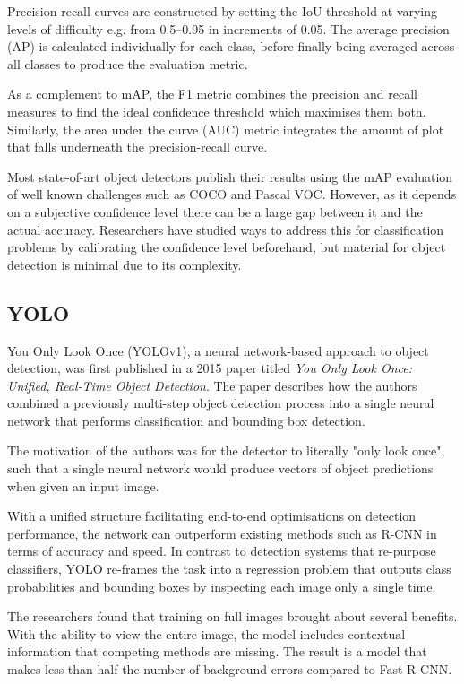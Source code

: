 \documentclass{thesis}
\begin{document}
Precision-recall curves are constructed by setting the IoU threshold at varying levels of difficulty e.g. from 0.5--0.95 in increments of 0.05. The average precision (AP) is calculated individually for each class, before finally being averaged across all classes to produce the evaluation metric.

As a complement to mAP, the F1 metric combines the precision and recall measures to find the ideal confidence threshold which maximises them both. Similarly,
the area under the curve (AUC) metric integrates the amount of plot that falls underneath the precision-recall curve.

Most state-of-art object detectors publish their results using the mAP evaluation of well known challenges such as COCO\cite{lin2015microsoft} and Pascal VOC\cite{Everingham15}. However, as it depends on a subjective confidence level there can be a large gap between it and the actual accuracy\cite{Peng2021}. Researchers have studied ways to address this for classification problems by calibrating the confidence level beforehand\cite{guo2017calibration}, but material for object detection is minimal due to its complexity.


\subsection{YOLO}

You Only Look Once (YOLOv1), a neural network-based approach to object detection, was first published in a 2015 paper titled \textit{You Only Look Once: Unified, Real-Time Object Detection}. The paper describes how the authors combined a previously multi-step object detection process into a single neural network that performs classification and bounding box detection.

The motivation of the authors was for the detector to literally "only look once", such that a single neural network would produce vectors of object predictions when given an input image.

With a unified structure facilitating end-to-end optimisations on detection performance, the network can outperform existing methods such as R-CNN in terms of accuracy and speed\cite{yolov1}. In contrast to detection systems that re-purpose classifiers, YOLO re-frames the task into a regression problem that outputs class probabilities and bounding boxes by inspecting each image only a single time. 

The researchers found that training on full images brought about several benefits. With the ability to view the entire image, the model includes contextual information that competing methods are missing\cite{frcnn}. The result is a model that makes less than half the number of background errors compared to Fast R-CNN\cite{yolov1}.
\end{document}
